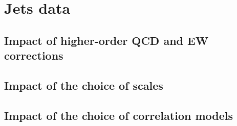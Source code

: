 \chapter{Jets data}

\section{Impact of higher-order QCD and EW corrections}

\section{Impact of the choice of scales}

\section{Impact of the choice of correlation models}